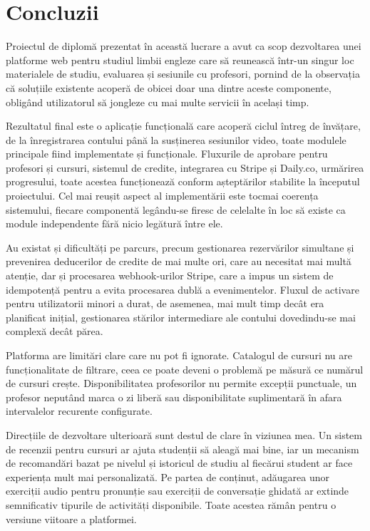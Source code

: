\chapter{Concluzii}
Proiectul de diplomă prezentat în această lucrare a avut ca scop dezvoltarea unei platforme web pentru studiul limbii engleze care să reunească într-un singur loc materialele de studiu, evaluarea și sesiunile cu profesori, pornind de la observația că soluțiile existente acoperă de obicei doar una dintre aceste componente, obligând utilizatorul să jongleze cu mai multe servicii în același timp.

Rezultatul final este o aplicație funcțională care acoperă ciclul întreg de învățare, de la înregistrarea contului până la susținerea sesiunilor video, toate modulele principale fiind implementate și funcționale. Fluxurile de aprobare pentru profesori și cursuri, sistemul de credite, integrarea cu Stripe și Daily.co, urmărirea progresului, toate acestea funcționează conform așteptărilor stabilite la începutul proiectului. Cel mai reușit aspect al implementării este tocmai coerența sistemului, fiecare componentă legându-se firesc de celelalte în loc să existe ca module independente fără nicio legătură între ele.

Au existat și dificultăți pe parcurs, precum gestionarea rezervărilor simultane și prevenirea deducerilor de credite de mai multe ori, care au necesitat mai multă atenție, dar și procesarea webhook-urilor Stripe, care a impus un sistem de idempotență pentru a evita procesarea dublă a evenimentelor. Fluxul de activare pentru utilizatorii minori a durat, de asemenea, mai mult timp decât era planificat inițial, gestionarea stărilor intermediare ale contului dovedindu-se mai complexă decât părea.

Platforma are limitări clare care nu pot fi ignorate. Catalogul de cursuri nu are funcționalitate de filtrare, ceea ce poate deveni o problemă pe măsură ce numărul de cursuri crește. Disponibilitatea profesorilor nu permite excepții punctuale, un profesor neputând marca o zi liberă sau disponibilitate suplimentară în afara intervalelor recurente configurate.

Direcțiile de dezvoltare ulterioară sunt destul de clare în viziunea mea. Un sistem de recenzii pentru cursuri ar ajuta studenții să aleagă mai bine, iar un mecanism de recomandări bazat pe nivelul și istoricul de studiu al fiecărui student ar face experiența mult mai personalizată. Pe partea de conținut, adăugarea unor exerciții audio pentru pronunție sau exerciții de conversație ghidată ar extinde semnificativ tipurile de activități disponibile. Toate acestea rămân pentru o versiune viitoare a platformei.
